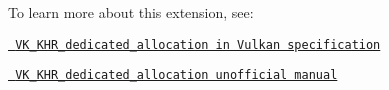 To learn more about this extension, see\+:


\begin{DoxyItemize}
\item \href{https://www.khronos.org/registry/vulkan/specs/1.2-extensions/html/chap44.html\#VK_KHR_dedicated_allocation}{\texttt{ VK\+\_\+\+KHR\+\_\+dedicated\+\_\+allocation in Vulkan specification}}
\item \href{http://asawicki.info/articles/VK_KHR_dedicated_allocation.php5}{\texttt{ VK\+\_\+\+KHR\+\_\+dedicated\+\_\+allocation unofficial manual}} 
\end{DoxyItemize}